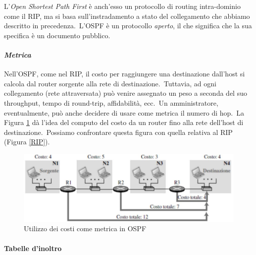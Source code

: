 L'\emph{Open Shortest Path First} è anch'esso un protocollo di routing intra-dominio come il RIP, ma si basa sull'instradamento a stato del collegamento che abbiamo descritto in precedenza.\
L'OSPF è un protocollo \emph{aperto}, il che significa che la sua specifica è un documento pubblico.

\paragraph{\emph{Metrica}}

Nell'OSPF, come nel RIP, il costo per raggiungere una destinazione dall'host si calcola dal router sorgente alla rete di destinazione.\
Tuttavia, ad ogni collegamento (rete attraversata) può venire assegnato un peso a seconda del suo throughput, tempo di round-trip, affidabilità, ecc.\
Un amministratore, eventualmente, può anche decidere di usare come metrica il numero di hop.\
La Figura \ref{fig:OSPF} dà l'idea del computo del costo da un router fino alla rete dell'host di destinazione.\
Possiamo confrontare questa figura con quella relativa al RIP (Figura \ref{RIP}).

\begin{figure}[H]
    \centering
    \includegraphics[width=\textwidth]{immagini/OSPF.jpg}
    \caption{Utilizzo dei costi come metrica in OSPF}
    \label{fig:OSPF}
\end{figure}

\paragraph{\textbf{Tabelle d'inoltro}}

